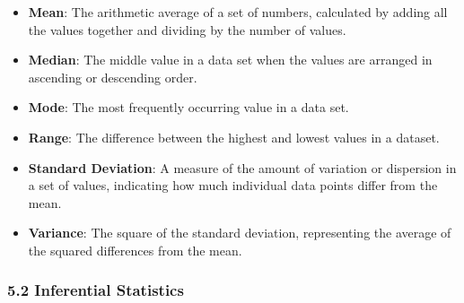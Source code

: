 \documentclass[
]{book}
\providecommand{\tightlist}{%
  \setlength{\itemsep}{0pt}\setlength{\parskip}{0pt}}
\begin{document}
\begin{itemize}
\tightlist
\item
  \textbf{Mean}: The arithmetic average of a set of numbers, calculated by adding all the values together and dividing by the number of values.
\item
  \textbf{Median}: The middle value in a data set when the values are arranged in ascending or descending order.
\item
  \textbf{Mode}: The most frequently occurring value in a data set.
\item
  \textbf{Range}: The difference between the highest and lowest values in a dataset.
\item
  \textbf{Standard Deviation}: A measure of the amount of variation or dispersion in a set of values, indicating how much individual data points differ from the mean.
\item
  \textbf{Variance}: The square of the standard deviation, representing the average of the squared differences from the mean.
\end{itemize}

\subsubsection*{\texorpdfstring{\textbf{5.2 Inferential Statistics}}{5.2 Inferential Statistics}}\label{inferential-statistics-1}
\end{document}
